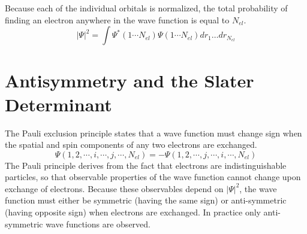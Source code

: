 Because each of the individual orbitals is normalized, the total
probability of finding an electron anywhere in the
wave function is equal to $N_{el}$. 
\begin{equation}
  |\Psi|^2 = \int\Psi^*(1\cdots N_{el})\Psi(1\cdots N_{el})
	dr_1\dots dr_{N_{el}}
\end{equation}

\section{Antisymmetry and the Slater Determinant}
The Pauli exclusion principle states that a wave function
must change sign when the spatial and spin components of any two
electrons are exchanged. 
\begin{equation}  
	\Psi(1,2,\cdots,i,\cdots,j,\cdots,N_{el}) = 
	-\Psi(1,2,\cdots,j,\cdots,i,\cdots,N_{el})
\end{equation}
The Pauli principle derives from the fact that electrons are
indistinguishable particles, so that observable properties of the wave
function cannot change upon exchange of electrons. Because these
observables depend on $|\Psi|^2$, the wave function must either be
symmetric (having the same sign) or anti-symmetric (having opposite
sign) when electrons are exchanged. In practice only anti-symmetric
wave functions are observed.

